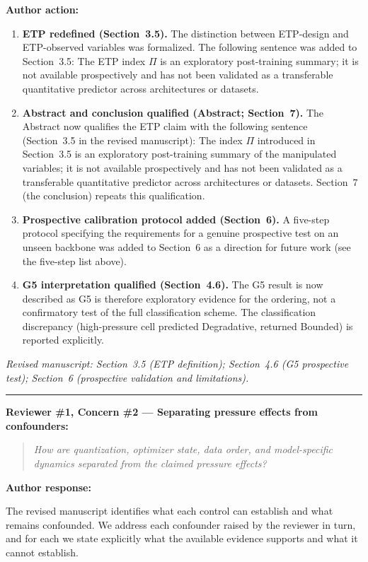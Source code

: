 \documentclass[11pt,a4paper]{article}
\newcommand{\newtext}[1]{#1}
\newcommand{\rconcern}[3]{%
  \bigskip\noindent\rule{\linewidth}{0.4pt}\par\medskip
  \noindent\textbf{\textcolor{rccolor}{#1 --- #2:}}\par
  \smallskip
  \begin{quote}\itshape\textcolor{rccolor}{#3}\end{quote}%
}
\newcommand{\arhead}[1]{\medskip\noindent\textbf{#1}\par\smallskip}
\newcommand{\newtext}[1]{\textcolor{chgcolor}{``#1''}}
\newcommand{\msloc}[1]{%
  \smallskip\noindent\textit{Revised manuscript: #1}\par%
}
\begin{document}
\arhead{Author action:}
\begin{enumerate}[leftmargin=1.4em,itemsep=0.3em]
\item \textbf{ETP redefined (Section~3.5).}
      The distinction between ETP-design and ETP-observed variables was
      formalized. The following sentence was added to Section~3.5:
      \newtext{The ETP index $\Pi$ is an exploratory post-training
      summary; it is not available prospectively and has not been
      validated as a transferable quantitative predictor across
      architectures or datasets.}
\item \textbf{Abstract and conclusion qualified (Abstract;
      Section~7).}
      The Abstract now qualifies the ETP claim with the following sentence
      (Section~3.5 in the revised manuscript):
      \newtext{The index $\Pi$ introduced in Section~3.5
      is an exploratory post-training summary of the manipulated
      variables; it is not available prospectively and has not been
      validated as a transferable quantitative predictor across
      architectures or datasets.} Section~7 (the conclusion) repeats
      this qualification.
\item \textbf{Prospective calibration protocol added (Section~6).}
      A five-step protocol specifying the requirements for a genuine
      prospective test on an unseen backbone was added to Section~6 as
      a direction for future work (see the five-step list above).
\item \textbf{G5 interpretation qualified (Section~4.6).}
      The G5 result is now described as \newtext{G5 is therefore exploratory evidence for the ordering, not a confirmatory test of the full classification scheme.} The classification discrepancy
      (high-pressure cell predicted Degradative, returned Bounded) is
      reported explicitly.
\end{enumerate}

\msloc{Section~3.5 (ETP definition); Section~4.6 (G5 prospective test); Section~6
(prospective validation and limitations).}

\rconcern{Reviewer \#1, Concern \#2}{Separating pressure effects from confounders}{How are quantization, optimizer state, data order, and model-specific dynamics separated from the claimed pressure effects?}

\arhead{Author response:}

The revised manuscript identifies what each control can establish and what
remains confounded. We address each confounder raised by the reviewer
in turn, and for each we state explicitly what the available evidence
supports and what it cannot establish.
\end{document}
